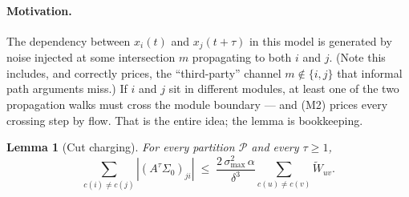\documentclass[11pt]{article}
\newtheorem{lemma}[theorem]{Lemma}
\theoremstyle{definition}
\theoremstyle{remark}
\newcommand{\Wt}{\widetilde{W}}
\begin{document}
\paragraph{Motivation.}
The dependency between $x_i(t)$ and $x_j(t{+}\tau)$ in this model is
generated by noise injected at some intersection $m$ propagating to both $i$
and $j$.
(Note this includes, and correctly prices, the ``third-party'' channel $m
    \notin \{i, j\}$ that informal path arguments miss.)
If $i$ and $j$ sit in different modules, at least one of the two propagation
walks must cross the module boundary --- and (M2) prices every crossing step
by flow.
That is the entire idea; the lemma is bookkeeping.

\begin{lemma}[Cut charging]
    \label{lem:cutcharge}
    For every partition $\mathcal{P}$ and every $\tau \geq 1$,
    \begin{equation}
        \sum_{c(i) \neq c(j)}
        \left|\left(A^\tau \Sigma_0\right)_{ji}\right|
        \;\leq\;
        \frac{2\, \sigma_{\max}^2\, \alpha}{\delta^{3}}
        \sum_{c(u) \neq c(v)} \Wt_{uv}.
        \label{eq:cutcharge}
    \end{equation}
\end{lemma}
\end{document}
